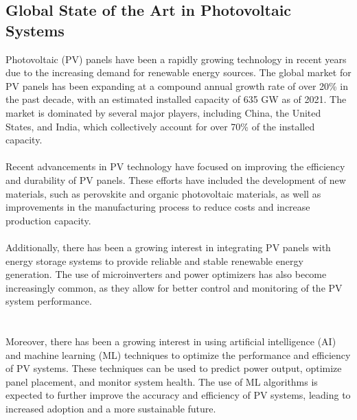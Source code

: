 \documentclass{report}
\begin{document}
\subsection{Global State of the Art in Photovoltaic Systems}
Photovoltaic (PV) panels have been a rapidly growing technology in recent years due to the increasing demand for renewable energy sources. The global market for PV panels has been expanding at a compound annual growth rate of over 20\% in the past decade, with an estimated installed capacity of 635 GW as of 2021. The market is dominated by several major players, including China, the United States, and India, which collectively account for over 70\% of the installed capacity.\\
\\
Recent advancements in PV technology have focused on improving the efficiency and durability of PV panels. These efforts have included the development of new materials, such as perovskite and organic photovoltaic materials, as well as improvements in the manufacturing process to reduce costs and increase production capacity\cite{CAPV}.\\
\\
Additionally, there has been a growing interest in integrating PV panels with energy storage systems to provide reliable and stable renewable energy generation. The use of microinverters and power optimizers has also become increasingly common, as they allow for better control and monitoring of the PV system performance.\\
\\
\\
Moreover, there has been a growing interest in using artificial intelligence (AI) and machine learning (ML) techniques to optimize the performance and efficiency of PV systems. These techniques can be used to predict power output, optimize panel placement, and monitor system health. The use of ML algorithms is expected to further improve the accuracy and efficiency of PV systems, leading to increased adoption and a more sustainable future\cite{GSA}.
\end{document}
